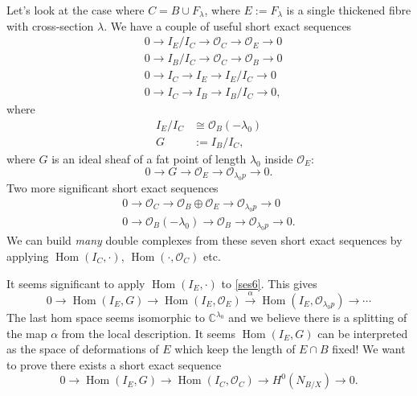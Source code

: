 \documentclass{amsart}
\theoremstyle{definition}
\newcommand{\CC} {\mathbb{C}}          %
\renewcommand{\O}{\mathcal{O}}
\newcommand{\Hom}{\operatorname{Hom}}
\begin{document}
Let's look at the case where $C = B \cup F_{\lambda}$, where $E:=F_\lambda$ is a single thickened fibre with cross-section $\lambda$. We have a couple of useful short exact sequences
\begin{align}
&0 \rightarrow I_E / I_C \rightarrow \O_C \rightarrow \O_E \rightarrow 0 \label{ses1} \\
&0 \rightarrow I_B / I_C \rightarrow \O_C \rightarrow \O_B \rightarrow 0 \label{ses2} \\
&0 \rightarrow I_C \rightarrow I_E \rightarrow I_E / I_C \rightarrow 0 \label{ses3} \\
&0 \rightarrow I_C \rightarrow I_B \rightarrow I_B / I_C \rightarrow 0, \label{ses4}
\end{align}
where 
\begin{align*}
I_E / I_C &\cong \O_B(-\lambda_0) \\
G&:=I_B / I_C,
\end{align*}
where $G$ is an ideal sheaf of a fat point of length $\lambda_0$ inside $\O_{E}$:
\begin{equation} \label{ses5}
0 \rightarrow G \rightarrow \O_E \rightarrow \O_{\lambda_0 p} \rightarrow 0.
\end{equation}
Two more significant short exact sequences
\begin{align} 
0 \rightarrow \O_C \rightarrow \O_B \oplus \O_E \rightarrow \O_{\lambda_0 p} \rightarrow 0 \label{ses6} \\
0 \rightarrow \O_B(-\lambda_0) \rightarrow \O_B \rightarrow \O_{\lambda_0 p} \rightarrow 0. \label{ses7}
\end{align}
We can build \emph{many} double complexes from these seven short exact sequences by applying $\Hom(I_C,\cdot)$, $\Hom(\cdot, \O_C)$ etc. 

It seems significant to apply $\Hom(I_E, \cdot)$ to \eqref{ses6}. This gives
\begin{equation} \label{split}
0 \rightarrow \Hom(I_E,G) \rightarrow \Hom(I_E,\O_E) \stackrel{\alpha}{\rightarrow} \Hom(I_E,\O_{\lambda_0 p}) \rightarrow \cdots
\end{equation}
The last hom space seems isomorphic to $\CC^{\lambda_0}$ and we believe there is a splitting of the map $\alpha$ from the local description. It seems $\Hom(I_E,G)$ can be interpreted as the space of deformations of $E$ which keep the length of $E \cap B$ fixed! We want to prove there exists a short exact sequence
$$
0 \rightarrow \Hom(I_E,G) \rightarrow \Hom(I_C,\O_C) \rightarrow H^0(N_{B/X}) \rightarrow 0.
$$
\end{document}
